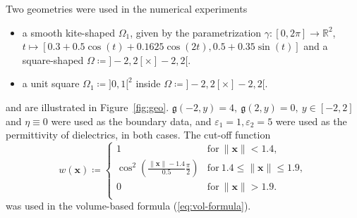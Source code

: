 \documentclass{article}
\theoremstyle{remark}
\newcommand{\x}{\boldsymbol{x}}
\newcommand{\argg}{\mathfrak{g}}
\begin{document}
Two geometries were used in the numerical experiments
\begin{itemize}
    \item a smooth kite-shaped $\Omega_1$, given by the parametrization $\gamma:[0,2\pi]\to\mathbb{R}^2$, $t\mapsto[0.3+0.5\cos(t)+0.1625\cos(2t),0.5+0.35\sin(t)]$ and a square-shaped $\Omega\coloneqq]-2,2[\times]-2,2[.$
    \item a unit square $\Omega_1\coloneqq]0,1[^2$ inside $\Omega\coloneqq]-2,2[\times]-2,2[.$
\end{itemize}
and are illustrated in Figure~\ref{fig:geo}. $\argg(-2,y)=4,~\argg(2,y)=0,~y\in[-2,2]$ and $\eta\equiv 0$ were used as the boundary data, and $\varepsilon_1=1, \varepsilon_2=5$ were used as the permittivity of dielectrics, in both cases. The cut-off function
\begin{equation}
    w(\x)\coloneqq
    \begin{cases}
    1 & \mathrm{for}~\|\x\|< 1.4,\\
    \cos^2\left(\frac{\|\x\|-1.4}{0.5}\frac{\pi}{2}\right) & \mathrm{for}~1.4\leq\|\x\|\leq 1.9,\\
    0 & \mathrm{for}~\|\x\|> 1.9.\\
    \end{cases}
\end{equation}
was used in the volume-based formula (\ref{eq:vol-formula}).
\end{document}
